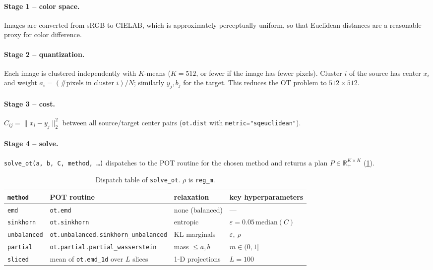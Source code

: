 \documentclass[11pt,a4paper]{article}
\newcommand{\R}{\mathbb{R}}
\newcommand{\code}[1]{\texttt{#1}}
\begin{document}
\paragraph{Stage 1 -- color space.} Images are converted from sRGB to CIELAB,
which is approximately perceptually uniform, so that Euclidean distances are a
reasonable proxy for color difference.

\paragraph{Stage 2 -- quantization.} Each image is clustered independently with
$K$-means ($K = 512$, or fewer if the image has fewer pixels). Cluster $i$ of the
source has center $x_i$ and weight $a_i = (\text{\# pixels in cluster } i)/N$;
similarly $y_j, b_j$ for the target. This reduces the OT problem to
$512 \times 512$.

\paragraph{Stage 3 -- cost.} $C_{ij} = \lVert x_i - y_j \rVert_2^2$ between all
source/target center pairs (\code{ot.dist} with \code{metric="sqeuclidean"}).

\paragraph{Stage 4 -- solve.} \code{solve\_ot(a, b, C, method, \dots)} dispatches
to the POT routine for the chosen method and returns a plan
$P \in \R_+^{K \times K}$ (\cref{tab:dispatch}).

\begin{table}[t]
\centering
\caption{Dispatch table of \code{solve\_ot}. $\rho$ is \code{reg\_m}.}
\label{tab:dispatch}
\begin{tabular}{@{}llll@{}}
\toprule
\code{method} & POT routine & relaxation & key hyperparameters \\
\midrule
\code{emd}        & \code{ot.emd}                              & none (balanced) & --- \\
\code{sinkhorn}   & \code{ot.sinkhorn}                         & entropic        & $\varepsilon = 0.05\,\mathrm{median}(C)$ \\
\code{unbalanced} & \code{ot.unbalanced.sinkhorn\_unbalanced}  & KL marginals    & $\varepsilon,\ \rho$ \\
\code{partial}    & \code{ot.partial.partial\_wasserstein}     & mass $\le a,b$  & $m \in (0,1]$ \\
\code{sliced}     & mean of \code{ot.emd\_1d} over $L$ slices  & 1-D projections & $L = 100$ \\
\bottomrule
\end{tabular}
\end{table}
\end{document}
